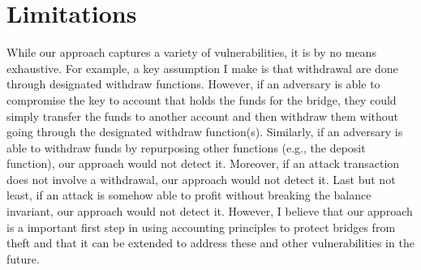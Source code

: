 \section{Limitations}
While our approach captures a variety of vulnerabilities, it is by no means exhaustive. For example, a key assumption I make is that withdrawal are done through designated withdraw functions. However, if an adversary is able to compromise the key to account that holds the funds for the bridge, they could simply transfer the funds to another account and then withdraw them without going through the designated withdraw function(s). Similarly, if an adversary is able to withdraw funds by repurposing other functions (e.g., the deposit function), our approach would not detect it. Moreover, if an attack transaction does not involve a withdrawal, our approach would not detect it. Last but not least, if an attack is somehow able to profit without breaking the balance invariant, our approach would not detect it.  However, I believe that our approach is a important first step in using accounting principles to protect bridges from theft and that it can be extended to address these and other vulnerabilities in the future.